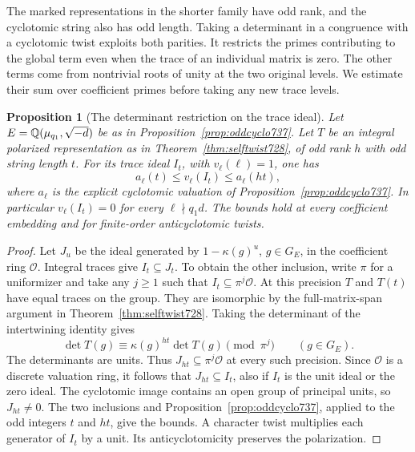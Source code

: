 \documentclass[a4paper,11pt]{article}
\newtheorem{proposition}{Proposition}[section]
\theoremstyle{definition}
\theoremstyle{remark}
\numberwithin{equation}{section}
\begin{document}
The marked representations in the shorter family have odd rank,
and the cyclotomic string also has odd length. Taking a determinant
in a congruence with a cyclotomic twist exploits both parities. It
restricts the primes contributing to the global term even when the
trace of an individual matrix is zero. The other terms come from
nontrivial roots of unity at the two original levels. We estimate
their sum over coefficient primes before taking any new trace levels.

\begin{proposition}[The determinant restriction on the trace ideal]
\leavevmode\label{prop:oddtraceideal739}
Let \(E=\mathbb Q(\mu_{q_1},\sqrt{-d})\) be as in
Proposition~\ref{prop:oddcyclo737}. Let \(T\) be an integral
polarized representation as in Theorem~\ref{thm:selftwist728},
of odd rank \(h\) with odd string length \(t\). For its trace
ideal \(I_t\), with \(v_\ell(\ell)=1\), one has
\[
           a_\ell(t)\le v_\ell(I_t)\le a_\ell(ht),
\]
where \(a_\ell\) is the explicit cyclotomic valuation of
Proposition~\ref{prop:oddcyclo737}. In particular
\(v_\ell(I_t)=0\) for every \(\ell\nmid q_1d\). The bounds hold
at every coefficient embedding and for finite-order
anticyclotomic twists.
\end{proposition}
\begin{proof}
Let \(J_u\) be the ideal generated by \(1-\kappa(g)^u\),
\(g\in G_E\), in the coefficient ring \(\mathcal O\). Integral
traces give \(I_t\subseteq J_t\). To obtain the other inclusion,
write \(\pi\) for a uniformizer and take any \(j\ge1\) such that
\(I_t\subseteq\pi^j\mathcal O\). At this precision \(T\) and
\(T(t)\) have equal traces on the group. They are isomorphic by
the full-matrix-span argument in Theorem~\ref{thm:selftwist728}.
Taking the determinant of the intertwining identity gives
\[
        \det T(g)\equiv \kappa(g)^{ht}\det T(g)\pmod{\pi^j}
                         \qquad (g\in G_E).
\]
The determinants are units. Thus \(J_{ht}\subseteq\pi^j\mathcal O\)
at every such precision. Since \(\mathcal O\) is a discrete
valuation ring, it follows that \(J_{ht}\subseteq I_t\), also if
\(I_t\) is the unit ideal or the zero ideal. The cyclotomic image
contains an open group of principal units, so \(J_{ht}\ne0\).
The two inclusions and Proposition~\ref{prop:oddcyclo737}, applied
to the odd integers \(t\) and \(ht\), give the bounds. A character
twist multiplies each generator of \(I_t\) by a unit. Its
anticyclotomicity preserves the polarization.
\end{proof}
\end{document}
